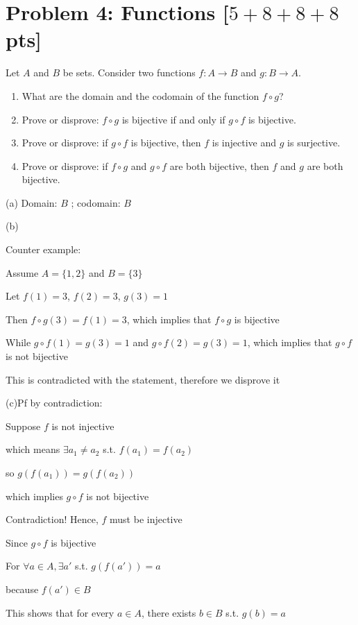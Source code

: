 \documentclass[11pt,twoside]{article}
\newcommand{\problem}[1]{\section*{Problem #1}}
\begin{document}
\problem{4: Functions [$5+8+8+8$ pts]}
Let $A$ and $B$ be sets.
Consider two functions $f: A \rightarrow B$ and $g: B \rightarrow A$.
\begin{enumerate}
\item What are the domain and the codomain of the function $f \circ g$?
\item Prove or disprove: $f \circ g$ is bijective if and only if $g \circ f$ is bijective.
\item Prove or disprove: if $g \circ f$ is bijective, then $f$ is injective and $g$ is surjective.
\item Prove or disprove: if $f \circ g$ and $g \circ f$ are both bijective, then $f$ and $g$ are both bijective.
\end{enumerate}


\hspace*{\fill}


(a)
Domain: $B$ ; codomain: $B$

\hspace*{\fill}

(b)

Counter example:

Assume $A=\{1,2\}$ and $B=\{3\}$

Let $f(1)=3$, $f(2)=3$, $g(3) =1$

Then $f \circ g(3) = f(1) = 3$, which implies that $f \circ g$ is bijective

While $g \circ f(1) = g(3) =1 $ and $g \circ f(2) = g(3) =1 $, which implies that $g \circ f$ is not bijective

This is contradicted with the statement, therefore we disprove it


\hspace*{\fill}

(c)Pf by contradiction:

Suppose $f$ is not injective

which means $\exists a_1\neq a_2$ s.t. $f(a_1) = f(a_2)$

so $g(f(a_1)) = g(f(a_2))$

which implies $g\circ f $ is not bijective

Contradiction! Hence, $f$ must be injective

Since $g\circ f $ is bijective

For $\forall a \in A, \exists a'$ s.t. $g(f(a')) = a$

because $f(a') \in B$

This shows that for every $a \in A$, there exists $b \in B$ s.t. $g(b) = a$
\end{document}
